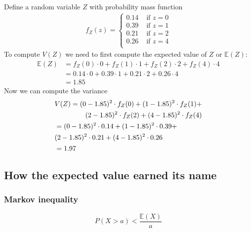 \ex Define a random variable $Z$ with probability mass function 
\begin{align}
    f_{Z}(z) = \begin{cases}
                  0.14 & \text{ if } z=0\\
                  0.39 & \text{ if } z=1\\
                  0.21 & \text{ if } z=2\\
                  0.26 & \text{ if } z=4\\
               \end{cases}
\end{align}
To compute $V(Z)$ we need to first compute the expected value of $Z$ or $\mathbb{E}(Z)$: 
\begin{align}
    \mathbb{E}(Z) &= f_{Z}(0) \cdot 0 + f_{Z}(1) \cdot 1 + f_{Z}(2) \cdot 2 + f_{Z}(4) \cdot 4\\
                  &= 0.14 \cdot 0 + 0.39 \cdot 1 + 0.21 \cdot 2 + 0.26 \cdot 4\\
                  &= 1.85 
\end{align}
Now we can compute the variance
\begin{align}
    &\begin{aligned}
        V(Z) = (0-1.85)^{2} \cdot f_{Z}(0) + (1-1.85)^{2} \cdot f_{Z}(1) +\\
          (2-1.85)^{2} \cdot f_{Z}(2) + (4-1.85)^{2} \cdot f_{Z}(4)
    \end{aligned}\vspace{3mm}\\ 
    &\begin{aligned}
        &=(0-1.85)^{2} \cdot 0.14 + (1-1.85)^{2} \cdot 0.39 +\\
        &(2-1.85)^{2} \cdot 0.21 + (4-1.85)^{2} \cdot 0.26
    \end{aligned}  \vspace{3mm}\\ 
    &= 1.97
\end{align}


\subsection{ How the expected value earned its name }


\subsubsection{Markov inequality}

\begin{equation}
    P(X > a) < \frac{ \mathbb{E}(X) }{a}
\end{equation}

